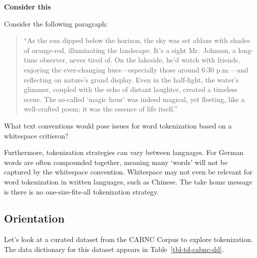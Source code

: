 \documentclass[
  letterpaper,
  DIV=11,
  numbers=noendperiod]{scrreport}
\theoremstyle{definition}
\theoremstyle{remark}
\begin{document}
\begin{tcolorbox}[enhanced jigsaw, leftrule=.75mm, bottomrule=.15mm, opacityback=0, breakable, left=2mm, colback=white, toprule=.15mm, arc=.35mm, rightrule=.15mm]

\textbf{ Consider this}

Consider the following paragraph:

\begin{quote}
``As the sun dipped below the horizon, the sky was set ablaze with
shades of orange-red, illuminating the landscape. It's a sight
Mr.~Johnson, a long-time observer, never tired of. On the lakeside, he'd
watch with friends, enjoying the ever-changing hues---especially those
around 6:30 p.m.---and reflecting on nature's grand display. Even in the
half-light, the water's glimmer, coupled with the echo of distant
laughter, created a timeless scene. The so-called `magic hour' was
indeed magical, yet fleeting, like a well-crafted poem; it was the
essence of life itself.''
\end{quote}

What text conventions would pose issues for word tokenization based on a
whitespace critieron?

\end{tcolorbox}

Furthermore, tokenization strategies can vary between languages. For
German words are often compounded together, meaning many `words' will
not be captured by the whitespace convention. Whitespace may not even be
relevant for word tokenization in written languages, such as Chinese.
The take home message is there is no one-size-fits-all tokenization
strategy.

\hypertarget{sec-td-tokenization-orientation}{%
\subsection{Orientation}\label{sec-td-tokenization-orientation}}

Let's look at a curated dataset from the CABNC Corpus to explore
tokenization. The data dictionary for this dataset appears in
Table~\ref{tbl-td-cabnc-dd}.
\end{document}
